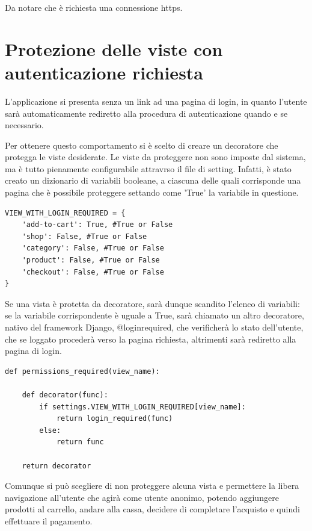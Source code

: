 
Da notare che è richiesta una connessione https.

\section{Protezione delle viste con autenticazione richiesta}
L'applicazione si presenta senza un link ad una pagina di login, in quanto l'utente sarà automaticamente rediretto alla procedura di autenticazione quando e se necessario. 

Per ottenere questo comportamento si è scelto di creare un decoratore che protegga le viste desiderate.
Le viste da proteggere non sono imposte dal sistema, ma è tutto pienamente configurabile attravrso il file di setting. Infatti, è stato creato un dizionario di variabili booleane, a ciascuna delle quali corrisponde una pagina che è possibile proteggere settando come 'True' la variabile in questione.

\begin{shaded}
\begin{lstlisting}
VIEW_WITH_LOGIN_REQUIRED = {
    'add-to-cart': True, #True or False
    'shop': False, #True or False
    'category': False, #True or False
    'product': False, #True or False
    'checkout': False, #True or False
}
\end{lstlisting}
\end{shaded}

Se una vista è protetta da decoratore, sarà dunque scandito l'elenco di variabili: se la variabile corrispondente è uguale a True, sarà chiamato un altro decoratore, nativo del framework Django, @login\textunderscore required, che verificherà lo stato dell'utente, che se loggato procederà verso la pagina richiesta, altrimenti sarà rediretto alla pagina di login.

\begin{shaded}
\begin{lstlisting}
def permissions_required(view_name):
    
    def decorator(func):
        if settings.VIEW_WITH_LOGIN_REQUIRED[view_name]:
            return login_required(func)
        else:
            return func

    return decorator
\end{lstlisting}
\end{shaded}

Comunque si può scegliere di non proteggere alcuna vista e permettere la libera navigazione all'utente che agirà come utente anonimo, potendo aggiungere prodotti al carrello, andare alla cassa, decidere di completare l'acquisto e quindi effettuare il pagamento.


